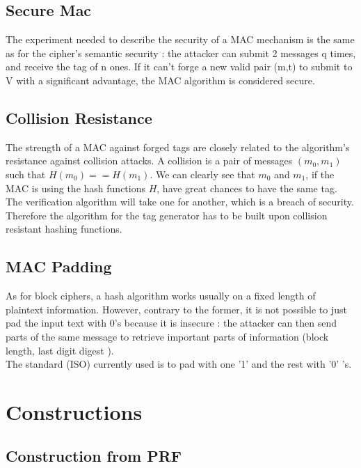 \subsection{Secure Mac}

The experiment needed to describe the security of a MAC mechanism is the same as for the cipher's semantic security : the attacker can submit 2 messages q times, and receive the tag of n ones. If it can't forge a new valid pair (m,t) to submit to V with a significant advantage, the MAC algorithm is considered secure.

\subsection{Collision Resistance}

The strength of a MAC against forged tags are closely related to the algorithm's resistance against collision attacks. A collision is a pair of messages $(m_0,m_1)$ such that $H(m_0) == H(m_1)$. We can clearly see that $m_0$ and $m_1$, if the MAC is using the hash functions $H$, have great chances to have the same tag. The verification algorithm will take one for another, which is a breach of security. \\
Therefore the algorithm for the tag generator has to be built upon collision resistant hashing functions.


\subsection{MAC Padding}
\label{sec:ISOPadding}

As for block ciphers, a hash algorithm works usually on a fixed length of plaintext information. However, contrary to the former, it is not possible to just pad the input text with 0's because it is insecure : the attacker can then send parts of the same message to retrieve important parts of information (block length, last digit digest ). \\
The standard (ISO) currently used is to pad with one '1' and the rest with '0' 's.


\section{Constructions}

\subsection{Construction from PRF}

